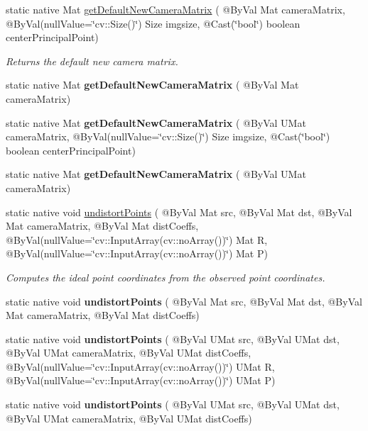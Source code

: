 \begin{DoxyCompactItemize}
\item 
static native Mat \hyperlink{group__imgproc__transform_gadf9fb3deefd512a073b449832fe60679}{get\+Default\+New\+Camera\+Matrix} ( @By\+Val Mat camera\+Matrix, @By\+Val(null\+Value=\char`\"{}cv\+::\+Size()\char`\"{}) Size imgsize, @Cast(\char`\"{}bool\char`\"{}) boolean center\+Principal\+Point)
\begin{DoxyCompactList}\small\item\em Returns the default new camera matrix. \end{DoxyCompactList}\item 
static native Mat {\bfseries get\+Default\+New\+Camera\+Matrix} ( @By\+Val Mat camera\+Matrix)
\item 
static native Mat {\bfseries get\+Default\+New\+Camera\+Matrix} ( @By\+Val U\+Mat camera\+Matrix, @By\+Val(null\+Value=\char`\"{}cv\+::\+Size()\char`\"{}) Size imgsize, @Cast(\char`\"{}bool\char`\"{}) boolean center\+Principal\+Point)
\item 
static native Mat {\bfseries get\+Default\+New\+Camera\+Matrix} ( @By\+Val U\+Mat camera\+Matrix)
\item 
static native void \hyperlink{group__imgproc__transform_gaacf4ed74dd09b28d673cc4b0f0257aa8}{undistort\+Points} ( @By\+Val Mat src, @By\+Val Mat dst, @By\+Val Mat camera\+Matrix, @By\+Val Mat dist\+Coeffs, @By\+Val(null\+Value=\char`\"{}cv\+::\+Input\+Array(cv\+::no\+Array())\char`\"{}) Mat R, @By\+Val(null\+Value=\char`\"{}cv\+::\+Input\+Array(cv\+::no\+Array())\char`\"{}) Mat P)
\begin{DoxyCompactList}\small\item\em Computes the ideal point coordinates from the observed point coordinates. \end{DoxyCompactList}\item 
static native void {\bfseries undistort\+Points} ( @By\+Val Mat src, @By\+Val Mat dst, @By\+Val Mat camera\+Matrix, @By\+Val Mat dist\+Coeffs)
\item 
static native void {\bfseries undistort\+Points} ( @By\+Val U\+Mat src, @By\+Val U\+Mat dst, @By\+Val U\+Mat camera\+Matrix, @By\+Val U\+Mat dist\+Coeffs, @By\+Val(null\+Value=\char`\"{}cv\+::\+Input\+Array(cv\+::no\+Array())\char`\"{}) U\+Mat R, @By\+Val(null\+Value=\char`\"{}cv\+::\+Input\+Array(cv\+::no\+Array())\char`\"{}) U\+Mat P)
\item 
static native void {\bfseries undistort\+Points} ( @By\+Val U\+Mat src, @By\+Val U\+Mat dst, @By\+Val U\+Mat camera\+Matrix, @By\+Val U\+Mat dist\+Coeffs)
\item 

\end{DoxyCompactItemize}

